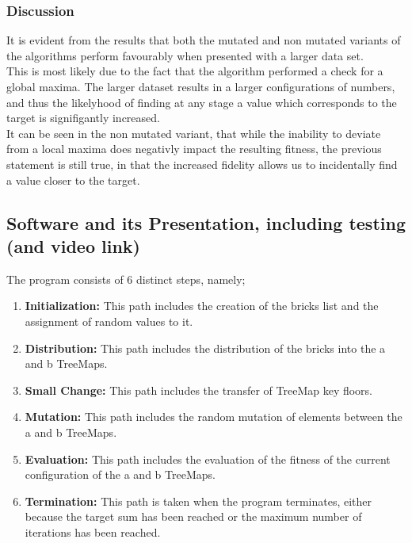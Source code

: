 \documentclass[a4paper]{article}
\begin{document}
\subsubsection{Discussion}

It is evident from the results that both the mutated and non mutated variants
of the algorithms perform favourably when presented with a larger data set. \\

This is most likely due to the fact that the algorithm performed a check for 
a global maxima.
The larger dataset results in a larger configurations of numbers,
and thus the likelyhood of finding at any stage a value which 
corresponds to the target is signifigantly increased. \\

It can be seen in the non mutated variant, that while the inability to deviate from
a local maxima does negativly impact the resulting fitness, the previous statement is still true, 
in that the increased fidelity allows us to incidentally find a value closer to the target.



\newpage
\subsection{Software and its Presentation, including testing (and video link)}
\vspace{4mm}
The program consists of 6 distinct steps, namely;
\vspace{4mm}
\begin{enumerate}
  \item \textbf{Initialization:} This path includes the creation of the bricks list and the assignment of random values to it.
  \item \textbf{Distribution:} This path includes the distribution of the bricks into the a and b TreeMaps.
  \item \textbf{Small Change:} This path includes the transfer of TreeMap key floors.
  \item \textbf{Mutation:} This path includes the random mutation of elements between the a and b TreeMaps.
  \item \textbf{Evaluation:} This path includes the evaluation of the fitness of the current configuration of the a and b TreeMaps.
  \item \textbf{Termination:} This path is taken when the program terminates, either because the target sum has been reached or the maximum number of iterations has been reached.
  \end{enumerate}
\end{document}

